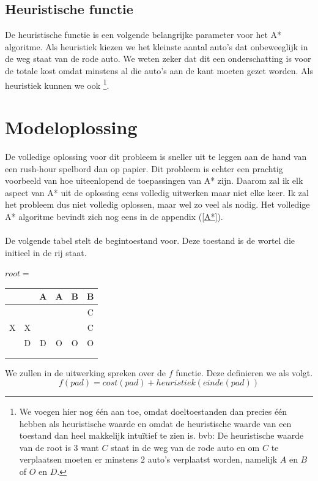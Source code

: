 \documentclass[alternative-exam.tex]{subfiles}
\begin{document}
\subsection{Heuristische functie} De heuristische functie is een volgende belangrijke parameter voor het A* algoritme. Als heuristiek kiezen we het kleinste aantal auto's dat onbeweeglijk in de weg staat van de rode auto. We weten zeker dat dit een onderschatting is voor de totale kost omdat minstens al die auto's aan de kant moeten gezet worden. Als heuristiek kunnen we ook
\footnote{We voegen hier nog één aan toe, omdat doeltoestanden dan precies één hebben als heuristische waarde en omdat de heuristische waarde van een toestand dan heel makkelijk intu\"itief te zien is. bvb: De heuristische waarde van de root is $3$ want $C$ staat in de weg van de rode auto en om $C$ te verplaatsen moeten er minstens $2$ auto's verplaatst worden, namelijk $A$ en $B$ of $O$ en $D$.}.

\section{Modeloplossing}
De volledige oplossing voor dit probleem is sneller uit te leggen aan de hand van een rush-hour spelbord dan op papier. Dit probleem is echter een prachtig voorbeeld van hoe uiteenlopend de toepassingen van A* zijn. Daarom zal ik elk aspect van A* uit de oplossing eens volledig uitwerken maar niet elke keer. Ik zal het probleem dus niet volledig oplossen, maar wel zo veel als nodig. Het volledige A* algoritme bevindt zich nog eens in de appendix (\ref{A*}).\\\\
De volgende tabel stelt de begintoestand voor. Deze toestand is de wortel die initieel in de rij staat.
\begin{center}
$root = $
\begin{tabular}{| c | c | c | c | c | c |}
\hline
   &   & A & A & B & B \\ \hline
   &   &   &   &   & C \\ \hline
 X & X &   &   &   & C \\ \hline
   & D & D & O & O & O \\ \hline
   &   &   &   &   &   \\ \hline
   &   &   &   &   &   \\
\hline
\end{tabular}
\end{center}
We zullen in de uitwerking spreken over de $f$ functie. Deze definieren we als volgt.
\[
f(pad) = cost(pad) + heuristiek(einde(pad))
\]
\end{document}

